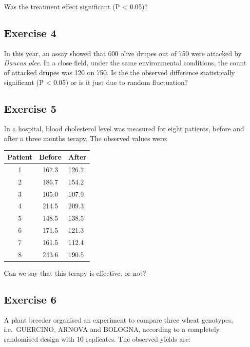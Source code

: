 \documentclass[a4paper,12pt,oneside]{book}
\begin{document}
Was the treatment effect significant (P \textless{} 0.05)?

\hypertarget{exercise-4-2}{%
\subsection{Exercise 4}\label{exercise-4-2}}

In this year, an assay showed that 600 olive drupes out of 750 were attacked by \emph{Daucus olee}. In a close field, under the same environmental conditions, the count of attacked drupes was 120 on 750. Is the the observed difference statistically significant (P \textless{} 0.05) or is it just due to random fluctuation?

\hypertarget{exercise-5-1}{%
\subsection{Exercise 5}\label{exercise-5-1}}

In a hospital, blood cholesterol level was measured for eight patients, before and after a three months terapy. The observed values were:

\begin{longtable}[]{@{}ccl@{}}
\toprule
Patient & Before & After \\
\midrule
\endhead
1 & 167.3 & 126.7 \\
2 & 186.7 & 154.2 \\
3 & 105.0 & 107.9 \\
4 & 214.5 & 209.3 \\
5 & 148.5 & 138.5 \\
6 & 171.5 & 121.3 \\
7 & 161.5 & 112.4 \\
8 & 243.6 & 190.5 \\
\bottomrule
\end{longtable}

Can we say that this terapy is effective, or not?

\hypertarget{exercise-6}{%
\subsection{Exercise 6}\label{exercise-6}}

A plant breeder organised an experiment to compare three wheat genotypes, i.e.~GUERCINO, ARNOVA and BOLOGNA, according to a completely randomised design with 10 replicates. The observed yields are:
\end{document}

